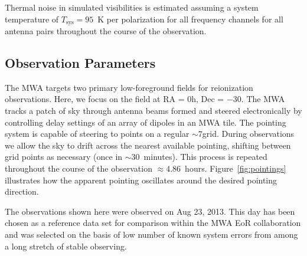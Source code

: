 \documentclass[preprint2,iop,numberedappendix]{emulateapj}
\begin{document}

Thermal noise in simulated visibilities is estimated assuming a system temperature of $T_\textrm{sys}=95$~K per polarization for all frequency channels for all antenna pairs throughout the course of the observation. %

\subsection{Observation Parameters}\label{sec:obsparms}

The MWA targets two primary low-foreground fields for reionization observations. Here, we focus on the field at RA = 0h, Dec = $-30$\arcdeg. The MWA tracks a patch of sky through antenna beams formed and steered electronically by controlling delay settings of an array of dipoles in an MWA tile. The pointing system is capable of steering to points on a regular $\sim$7\arcdeg grid. During observations we allow the sky to drift across the nearest available pointing, shifting between grid points as necessary (once in $\sim 30$~minutes). This process is repeated throughout the course of the observation $\approx 4.86$~hours. Figure~\ref{fig:pointings} illustrates how the apparent pointing oscillates around the desired pointing direction. 

The observations shown here were observed on Aug 23, 2013. This day has been chosen as a reference data set for comparison within the MWA EoR collaboration and was selected on the basis of low number of known system errors from among a long stretch of stable observing.  
\end{document}
